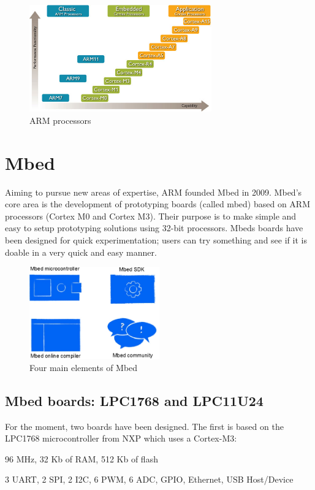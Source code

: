 \documentclass[pdftex,10pt,a4paper]{report}
\newenvironment{packed_item}{
\begin{itemize}
  \setlength{\itemsep}{1pt}
  \setlength{\parskip}{0pt}
  \setlength{\parsep}{0pt}
}{\end{itemize}}
\begin{document}
\begin{figure}[h!]
\centering
\includegraphics[width=0.7\textwidth]{./arm_proc.jpg}
\caption{ARM processors}
\label{ARM processors}
\end{figure}

\newpage

\section{Mbed}
Aiming to pursue new areas of expertise, ARM founded Mbed in 2009. Mbed's core area is the development of prototyping boards (called mbed) based on ARM processors (Cortex M0 and Cortex M3). Their purpose is to make simple and easy to setup prototyping solutions using 32-bit processors. Mbeds boards have been designed for quick experimentation; users can try something and see if it is doable in a very quick and easy manner.

\begin{figure}[h!]
\centering
\includegraphics[width=0.5\textwidth]{./mbed_4elements.jpg}
\caption{Four main elements of Mbed}
\label{Four main elements of Mbed}
\end{figure}

\subsection{Mbed boards: LPC1768 and LPC11U24}
For the moment, two boards have been designed. The first is based on the LPC1768 microcontroller from NXP which uses a Cortex-M3:
\begin{packed_item}
	\item 96 MHz, 32 Kb of RAM, 512 Kb of flash
	\item 3 UART, 2 SPI, 2 I2C, 6 PWM, 6 ADC, GPIO, Ethernet, USB Host/Device
\end{packed_item}
\end{document}
